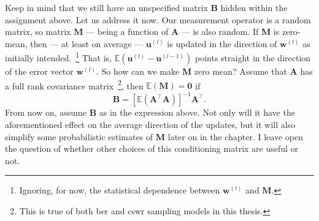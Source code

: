 Keep in mind that we still have an unspecified matrix $\mathbf{B}$ hidden within the assignment above. Let us address it now. Our measurement operator is a random matrix, so matrix $\mathbf{M}$ --- being a function of $\mathbf{A}$ --- is also random. If $\mathbf{M}$ is zero-mean, then --- at least on average --- $\mathbf{u}^{(l)}$ is updated in the direction of $\mathbf{w}^{(l)}$ as initially intended.~\footnote{Ignoring, for now, the statistical dependence between $\mathbf{w}^{(l)}$ and $\mathbf{M}$.} That is, $\mathbb{E} \left ( \mathbf{u}^{(l)} - \mathbf{u}^{(l-1)} \right )$ points straight in the direction of the error vector $\mathbf{w}^{(l)}$. So how can we make $\mathbf{M}$ zero mean? Assume that $\mathbf{A}$ has a full rank covariance matrix~\footnote{This is true of both \acrshort{ber} and \acrshort{cswr} sampling models in this thesis.}, then $\mathbb{E} \left ( \mathbf{M} \right ) = \mathbf{0}$ if
\begin{equation}
    \mathbf{B} = \left[ \mathbb{E} \left ( \mathbf{A}^{\top}\mathbf{A} \right ) \right]^{-1}\mathbf{A}^{\top}.
\end{equation}
From now on, assume $\mathbf{B}$ as in the expression above. Not only will it have the aforementioned effect on the average direction of the updates, but it will also simplify some probabilistic estimates of $\mathbf{M}$ later on in the chapter. I leave open the question of whether other choices of this conditioning matrix are useful or not.

